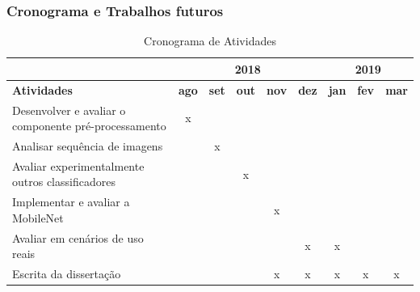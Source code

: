 \documentclass{beamer}
\begin{document}
\begin{frame}
 \frametitle{Cronograma e Trabalhos futuros}

\begin{table}\footnotesize
\tiny
\caption{Cronograma de Atividades}
\label{table:cronog}
\begin{tabular}{l|c|c|c|c|c|c|c|c|}
\cline{2-9}
                                                                           & \multicolumn{5}{c|}{\textbf{2018}}                                       & \multicolumn{3}{c|}{\textbf{2019}}         \\ \hline
\multicolumn{1}{|m{3cm}|}{\textbf{Atividades}}                                  & \textbf{ago} & \textbf{set} & \textbf{out} & \textbf{nov} & \textbf{dez} & \textbf{jan} & \textbf{fev} & \textbf{mar} \\ \hline
\multicolumn{1}{|m{3cm}|}{Desenvolver e avaliar o componente pré-processamento} & x            &              &              &              &              &              &              &              \\
\hline
\multicolumn{1}{|l|}{Analisar sequência de imagens}                        &              & x            &              &              &              &              &              &              \\
\hline
\multicolumn{1}{|m{3cm}|}{Avaliar experimentalmente outros classificadores}     &              &              & x            &              &              &              &              &              \\
\hline
\multicolumn{1}{|l|}{Implementar e avaliar a MobileNet}                    &              &              &              & x            &              &              &              &              \\
\hline
\multicolumn{1}{|l|}{Avaliar em cenários de uso reais}                     &              &              &              &              & x            & x            &              &              \\
\hline
\multicolumn{1}{|l|}{Escrita da dissertação}                                  &              &              &              & x            & x            & x            & x            & x            \\ \hline
\end{tabular}
\end{table} 
 
\end{frame}
\end{document}
